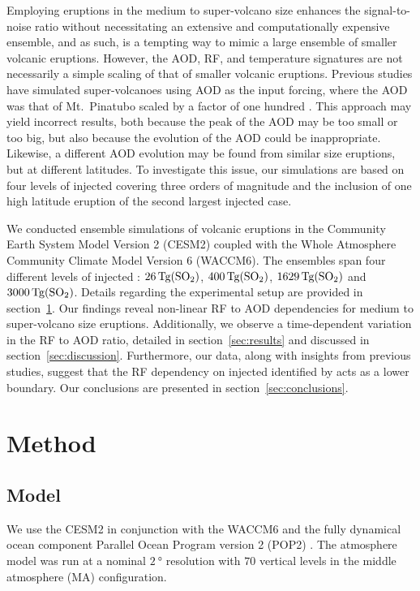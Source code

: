 \documentclass[draft]{agujournal2019}
\begin{document}
Employing eruptions in the medium to super-volcano size enhances the signal-to-noise
ratio without necessitating an extensive and computationally expensive ensemble, and as
such, is a tempting way to mimic a large ensemble of smaller volcanic eruptions.
However, the AOD, RF, and temperature signatures are not necessarily a simple scaling of
that of smaller volcanic eruptions. Previous studies have simulated super-volcanoes
using AOD as the input forcing, where the AOD was that of Mt.\ Pinatubo scaled by a
factor of one hundred \cite{jones2005}. This approach may yield incorrect results, both
because the peak of the AOD may be too small or too big, but also because the evolution
of the AOD could be inappropriate. Likewise, a different AOD evolution may be found from
similar size eruptions, but at different latitudes. To investigate this issue, our
simulations are based on four levels of injected  covering three orders of
magnitude and the inclusion of one high latitude eruption of the second largest injected
 case.

We conducted ensemble simulations of volcanic eruptions in the Community Earth System
Model Version 2 (CESM2) coupled with the Whole Atmosphere Community Climate Model
Version 6 (WACCM6). The ensembles span four different levels of injected :
\(\SI{26}{\tera\gram(\ce{SO2})}\), \(\SI{400}{\tera\gram(\ce{SO2})}\),
\(\SI{1629}{\tera\gram(\ce{SO2})}\) and \(\SI{3000}{\tera\gram(\ce{SO2})}\). Details
regarding the experimental setup are provided in section~\ref{sec:method}. Our findings
reveal non-linear RF to AOD dependencies for medium to super-volcano size eruptions.
Additionally, we observe a time-dependent variation in the RF to AOD ratio, detailed in
section~\ref{sec:results} and discussed in section~\ref{sec:discussion}. Furthermore,
our data, along with insights from previous studies, suggest that the RF dependency on
injected  identified by  acts as a lower boundary. Our
conclusions are presented in section~\ref{sec:conclusions}.

\section{Method}\label{sec:method}

\subsection{Model}

We use the CESM2 \cite{danabasoglu2020} in conjunction with the WACCM6
\cite{gettleman2019} and the fully dynamical ocean component Parallel Ocean Program
version 2 (POP2) \cite{smith2010, danabasoglu2020}. The atmosphere model was run at a
nominal \(\SI{2}{\degree}\) resolution with \(70\) vertical levels in the middle
atmosphere (MA) configuration.
\end{document}

